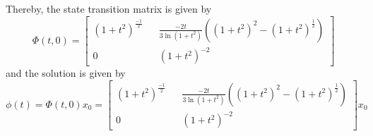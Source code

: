 Thereby, the state transition matrix is given by
\begin{equation*}
    \Phi(t, 0)
    =
    \begin{bmatrix}
        {(1+t^2)}^{\frac{-1}{2}}
         &  &
        \frac{-2t}{3\ln(1+t^2)} \left( {(1+t^2)}^{2} - {(1+t^2)}^{\frac{1}{2}} \right)
        \\
        0
         &  &
        {(1+t^2)}^{-2}
    \end{bmatrix}
\end{equation*}
and the solution is given by
\begin{equation*}
    \phi(t)
    =
    \Phi(t, 0) x_0
    =
    \begin{bmatrix}
        {(1+t^2)}^{\frac{-1}{2}}
         &  &
        \frac{-2t}{3\ln(1+t^2)} \left( {(1+t^2)}^{2} - {(1+t^2)}^{\frac{1}{2}} \right)
        \\
        0
         &  &
        {(1+t^2)}^{-2}
    \end{bmatrix}
    x_0
\end{equation*}
